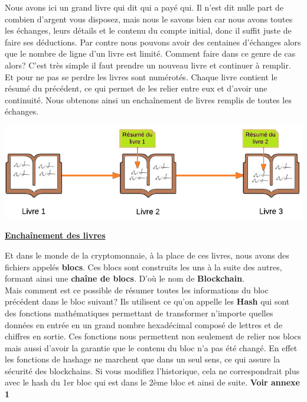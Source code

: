 \documentclass[12pt]{report}
\begin{document}
Nous avons ici un grand livre qui dit qui a payé qui. Il n'est dit nulle part de combien d'argent vous disposez, mais nous le savons bien car nous avons toutes les échanges, leurs détails et le contenu du compte initial, donc il suffit juste de faire ses déductions. Par contre nous pouvons avoir des centaines d'échanges alors que le nombre de ligne d'un livre est limité. Comment faire dans ce genre de cas alors? C'est très simple il faut prendre un nouveau livre et continuer à remplir. Et pour ne pas se perdre les livres sont numérotés. Chaque livre contient le résumé du précédent, ce qui permet de les relier entre eux et d'avoir une continuité. Nous obtenons ainsi un enchaînement de livres remplis de toutes les échanges.\\

\begin{center}
    \includegraphics[width=1\textwidth]{livre_compte_2}

    \textbf{\underline{Enchaînement des livres}} \\[1cm]
\end{center}

\hspace{1cm} Et dans le monde de la cryptomonnaie, à la place de ces livres, nous avons des fichiers appelés \textbf{blocs}. Ces blocs sont construits les uns à la suite des autres, formant ainsi une \textbf{chaîne de blocs}. D'où le nom de \textbf{Blockchain}.\\

\hspace{1cm} Mais comment est ce possible de résumer toutes les informations du bloc précédent dans le bloc suivant? Ils utilisent ce qu'on appelle les \textbf{Hash} qui sont des fonctions mathématiques permettant de transformer n'importe quelles données en entrée en un grand nombre hexadécimal composé de lettres et de chiffres en sortie. Ces fonctions nous permettent non seulement de relier nos blocs mais aussi d'avoir la garantie que le contenu du bloc n'a pas été changé. En effet les fonctions de hashage ne marchent que dans un seul sens, ce qui assure la sécurité des blockchains. Si vous modifiez l'historique, cela ne correspondrait plus avec le hash du 1er bloc qui est dans le 2ème bloc et ainsi de suite. \textbf{Voir annexe 1}\\
\end{document}
